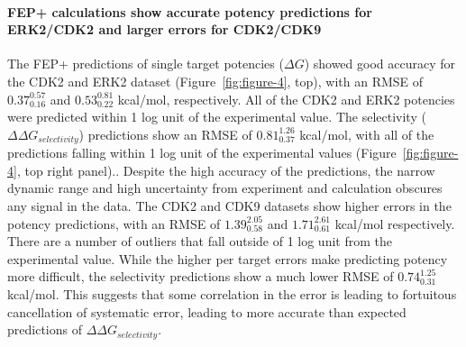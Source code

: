 \documentclass[9pt,lineno]{elife-modified} %
\begin{document}
\paragraph{FEP+ calculations show accurate potency predictions for ERK2/CDK2 and larger errors for CDK2/CDK9}
The FEP+ predictions of single target potencies ($\Delta G$) showed good accuracy for the CDK2 and ERK2 dataset (Figure~\ref{fig:figure-4}, top), with an RMSE of $0.37^{0.57}_{0.16}$ and $0.53^{0.81}_{0.22}$ kcal/mol, respectively. All of the CDK2 and ERK2 potencies were predicted within 1 log unit of the experimental value. The selectivity ($\Delta \Delta G_{selectivity}$) predictions show an RMSE of $0.81^{1.26}_{0.37}$ kcal/mol, with all of the predictions falling within 1 log unit of the experimental values (Figure~\ref{fig:figure-4}, top right panel).. Despite the high accuracy of the predictions, the narrow dynamic range and high uncertainty from experiment and calculation obscures any signal in the data. 
The CDK2 and CDK9 datasets show higher errors in the potency predictions, with an RMSE of $1.39^{2.05}_{0.58}$ and $1.71^{2.61}_{0.61}$ kcal/mol respectively. There are a number of outliers that fall outside of 1 log unit from the experimental value. While the higher per target errors make predicting potency more difficult, the selectivity predictions show a much lower RMSE of $0.74^{1.25}_{0.31}$ kcal/mol. This suggests that some correlation in the error is leading to fortuitous cancellation of systematic error, leading to more accurate than expected predictions of $\Delta \Delta G_{selectivity}$. 
\end{document}
